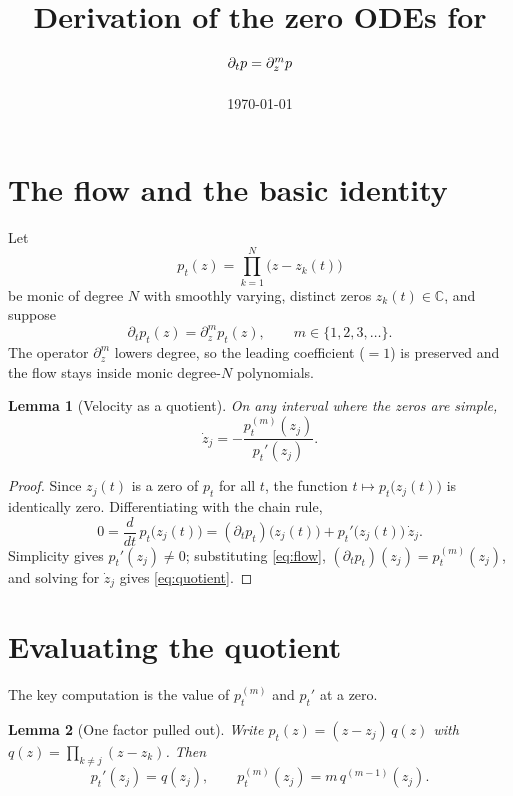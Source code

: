\documentclass[11pt]{article}
\title{Derivation of the zero ODEs for $\dt p=\dz^m p$}
\author{}
\date{\today}
\theoremstyle{plain}
\newtheorem{lemma}{Lemma}
\theoremstyle{definition}
\newcommand{\C}{\mathbb{C}}
\newcommand{\dt}{\partial_t}
\newcommand{\dz}{\partial_z}
\begin{document}
\maketitle

\section{The flow and the basic identity}

Let
\[
  p_t(z)=\prod_{k=1}^N\bigl(z-z_k(t)\bigr)
\]
be monic of degree $N$ with smoothly varying, distinct zeros $z_k(t)\in\C$, and
suppose
\begin{equation}\label{eq:flow}
  \dt p_t(z)=\dz^{m} p_t(z),\qquad m\in\{1,2,3,\dots\}.
\end{equation}
The operator $\dz^m$ lowers degree, so the leading coefficient ($=1$) is
preserved and the flow stays inside monic degree-$N$ polynomials.

\begin{lemma}[Velocity as a quotient]\label{lem:quotient}
On any interval where the zeros are simple,
\begin{equation}\label{eq:quotient}
  \dot z_j=-\frac{p_t^{(m)}(z_j)}{p_t'(z_j)} .
\end{equation}
\end{lemma}

\begin{proof}
Since $z_j(t)$ is a zero of $p_t$ for all $t$, the function
$t\mapsto p_t\bigl(z_j(t)\bigr)$ is identically zero. Differentiating with the
chain rule,
\[
  0=\frac{d}{dt}\,p_t\bigl(z_j(t)\bigr)
   =(\dt p_t)\bigl(z_j(t)\bigr)+p_t'\bigl(z_j(t)\bigr)\,\dot z_j .
\]
Simplicity gives $p_t'(z_j)\neq0$; substituting \eqref{eq:flow},
$(\dt p_t)(z_j)=p_t^{(m)}(z_j)$, and solving for $\dot z_j$ gives
\eqref{eq:quotient}.
\end{proof}

\section{Evaluating the quotient}

The key computation is the value of $p_t^{(m)}$ and $p_t'$ at a zero.

\begin{lemma}[One factor pulled out]\label{lem:leibniz}
Write $p_t(z)=(z-z_j)\,q(z)$ with $q(z)=\prod_{k\neq j}(z-z_k)$. Then
\[
  p_t'(z_j)=q(z_j),\qquad
  p_t^{(m)}(z_j)=m\,q^{(m-1)}(z_j).
\]
\end{lemma}
\end{document}
